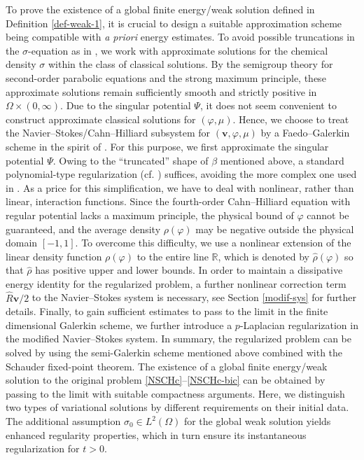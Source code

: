 \documentclass[11pt,reqno]{amsart}
\begin{document}
To prove the existence of a global finite energy/weak solution defined in Definition \ref{def-weak-1}, it is crucial to design a suitable approximation scheme being compatible with \textit{a priori} energy estimates. To avoid possible truncations in the $\sigma$-equation as in \cite{RSS2023}, we work with approximate solutions for the chemical density $\sigma$ within the class of classical solutions. By the semigroup theory for second-order parabolic equations and the strong maximum principle, these approximate solutions remain sufficiently smooth and strictly positive in $\Omega\times (0,\infty)$. Due to the singular potential $\Psi$, it does not seem convenient to construct approximate classical solutions for $(\varphi, \mu)$. Hence, we choose to treat the Navier--Stokes/Cahn--Hilliard subsystem for $(\bm{v}, \varphi, \mu)$ by a Faedo--Galerkin scheme in the spirit of \cite{Frigeri2016}. For this purpose, we first approximate the singular potential $\Psi$. Owing to the ``truncated'' shape of $\beta$ mentioned above, a standard polynomial-type regularization (cf. \cite{GMT2019,GiGrWu2018,MT16}) suffices, avoiding the more complex one used in \cite{GHW1}. As a price for this simplification, we have to deal with nonlinear, rather than linear, interaction functions.
Since the fourth-order Cahn--Hilliard equation with regular potential lacks a maximum principle, the physical bound of $\varphi$ cannot be guaranteed, and the average density $\rho(\varphi)$ may be negative outside the physical domain $[-1,1]$. To overcome this difficulty, we use a nonlinear extension of the linear density function $\rho(\varphi)$ to the entire line $\mathbb{R}$, which is denoted by $\widehat{\rho}(\varphi)$ so that $\widehat{\rho}$ has positive upper and lower bounds. In order to maintain a dissipative energy identity for the regularized problem, a further nonlinear correction term $\widehat{R}\bm{v}/2$ to the Navier--Stokes system is necessary, see Section \ref{modif-sys} for further details. Finally, to gain sufficient estimates to pass to the limit in the finite dimensional Galerkin scheme, we further introduce a $p$-Laplacian regularization in the modified Navier--Stokes system. In summary, the regularized problem can be solved by using the semi-Galerkin scheme mentioned above combined with the Schauder fixed-point theorem. The existence of a global finite energy/weak solution to the original problem \eqref{NSCHc}--\eqref{NSCHc-bic} can be obtained by passing to the limit with suitable compactness arguments. Here, we distinguish two types of variational solutions by different requirements on their initial data. The additional assumption $\sigma_0\in L^2(\Omega)$ for the global weak solution yields enhanced regularity properties, which in turn ensure its instantaneous regularization for $t > 0$.
\end{document}
